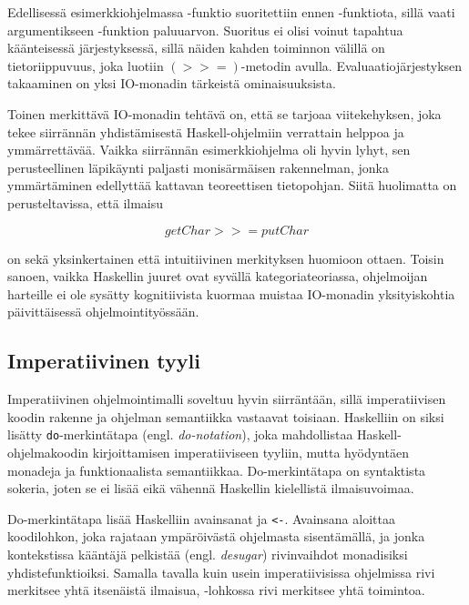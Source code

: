 \documentclass[finnish]{tktltiki2}
\begin{document}
Edellisessä esimerkkiohjelmassa -funktio suoritettiin ennen -funktiota,
sillä  vaati argumentikseen -funktion paluuarvon. Suoritus ei olisi
voinut tapahtua käänteisessä järjestyksessä, sillä näiden kahden toiminnon välillä on
tietoriippuvuus, joka luotiin $(>>=)$-metodin avulla. Evaluaatiojärjestyksen takaaminen on yksi
IO-monadin tärkeistä ominaisuuksista.

Toinen merkittävä IO-monadin tehtävä on, että se tarjoaa viitekehyksen, joka tekee siirrännän
yhdistämisestä Haskell-ohjelmiin verrattain helppoa ja ymmärrettävää. Vaikka siirrännän
esimerkkiohjelma oli hyvin lyhyt, sen perusteellinen läpikäynti paljasti monisärmäisen rakennelman,
jonka ymmärtäminen edellyttää kattavan teoreettisen tietopohjan. Siitä huolimatta on
perusteltavissa, että ilmaisu

$$ getChar >>= putChar $$

on sekä yksinkertainen että intuitiivinen merkityksen huomioon ottaen. Toisin sanoen, vaikka
Haskellin juuret ovat syvällä kategoriateoriassa, ohjelmoijan harteille ei ole sysätty kognitiivista
kuormaa muistaa IO-monadin yksityiskohtia päivittäisessä ohjelmointityössään.

\subsection{Imperatiivinen tyyli}


Imperatiivinen ohjelmointimalli soveltuu hyvin siirräntään, sillä imperatiivisen koodin rakenne ja
ohjelman semantiikka vastaavat toisiaan. Haskelliin on siksi lisätty \verb|do|-merkintätapa (engl.
\emph{do-notation}), joka mahdollistaa Haskell-ohjelmakoodin kirjoittamisen imperatiiviseen tyyliin,
mutta hyödyntäen monadeja ja funktionaalista semantiikkaa. Do-merkintätapa on syntaktista sokeria,
joten se ei lisää eikä vähennä Haskellin kielellistä ilmaisuvoimaa.

Do-merkintätapa lisää Haskelliin avainsanat  ja \verb|<-|. Avainsana  aloittaa
koodilohkon, joka rajataan ympäröivästä ohjelmasta sisentämällä, ja jonka kontekstissa kääntäjä
pelkistää (engl. \emph{desugar}) rivinvaihdot monadisiksi yhdistefunktioiksi. Samalla tavalla kuin
usein imperatiivisissa ohjelmissa rivi merkitsee yhtä itsenäistä ilmaisua, -lohkossa rivi
merkitsee yhtä toimintoa.
\end{document}
